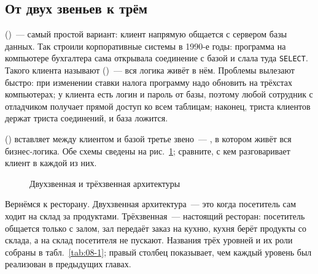 \subsection{От двух звеньев к трём}

 ()~--- самый простой вариант:
клиент напрямую общается с сервером базы данных. Так строили корпоративные
системы в 1990-е годы: программа на компьютере бухгалтера сама открывала
соединение с базой и слала туда \texttt{SELECT}. Такого клиента называют
 ()~--- вся логика живёт в нём. Проблемы вылезают
быстро: при изменении ставки налога программу надо обновить на трёхстах
компьютерах; у клиента есть логин и пароль от базы, поэтому любой сотрудник с
отладчиком получает прямой доступ ко всем таблицам; наконец, триста клиентов
держат триста соединений, и база ложится.

 () вставляет между клиентом и
базой третье звено~--- , в котором живёт вся
бизнес-логика. Обе схемы сведены на рис.~\ref{fig:08-1}; сравните, с кем
разговаривает клиент в каждой из них.

\begin{figure}[htbp]\centering
{}
\caption{Двухзвенная и трёхзвенная архитектуры}\label{fig:08-1}
\end{figure}

Вернёмся к ресторану. Двухзвенная архитектура~--- это когда посетитель сам
ходит на склад за продуктами. Трёхзвенная~--- настоящий ресторан: посетитель
общается только с залом, зал передаёт заказ на кухню, кухня берёт продукты со
склада, а на склад посетителя не пускают. Названия трёх уровней и их роли
собраны в табл.~\ref{tab:08-1}; правый столбец показывает, чем каждый уровень
был реализован в предыдущих главах.

